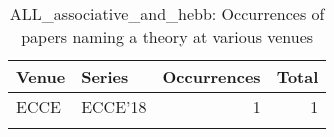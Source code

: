 \begin{table*}[t]
\begin{tabular}{llrr}
Venue & Series & Occurrences & Total\\\hline
\multirow{1}{*}{ECCE} & ECCE'18 & 1 & \multirow{1}{*}{1}\\
\caption{ALL_associative_and_hebb: Occurrences of papers naming a theory at various venues}
\end{tabular}
\end{table*}
